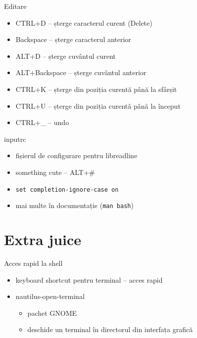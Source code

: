 \documentclass{beamer}
\begin{document}
\begin{frame}{Editare}
	\begin{itemize}
		\item CTRL+D -- șterge caracterul curent (Delete)
		\item Backspace -- șterge caracterul anterior
		\item ALT+D -- șterge cuvântul curent
		\item ALT+Backspace -- șterge cuvântul anterior
		\item CTRL+K -- șterge din poziția curentă până la sfârșit
		\item CTRL+U -- șterge din poziția curentâ până la început
		\item CTRL+\_ -- undo
	\end{itemize}
\end{frame}

\begin{frame}{inputrc}
	\begin{itemize}
		\item fișierul de configurare pentru libreadline
		\item something cute -- ALT+\#
		\item \texttt{set completion-ignore-case on}
		\item mai multe în documentație (\texttt{man bash})
	\end{itemize}
\end{frame}

\section{Extra juice}

\begin{frame}{Acces rapid la shell}
	\begin{itemize}
		\item keyboard shortcut pentru terminal -- acces rapid
		\item nautilus-open-terminal
			\begin{itemize}
				\item pachet GNOME
				\item deschide un terminal în directorul din interfața grafică
			\end{itemize}
	\end{itemize}
\end{frame}
\end{document}
